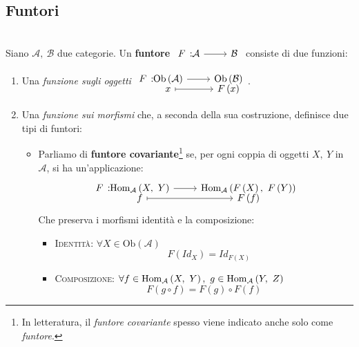 \subsection{Funtori}
\begin{define}[Funtore.]~{}\\
Siano $\mathcal{A},\ \mathcal{B}$ due categorie. Un \textbf{funtore} $\funz{F}{\mathcal{A}}{\mathcal{B}}$ consiste di due funzioni:
\begin{enumerate}
	\item Una \textit{funzione sugli oggetti} $\funztot{F}{\mathrm{Ob}\left(\mathcal{A}\right)}{\mathrm{Ob}\left(\mathcal{B}\right)}{x}{F\left(x\right)}$.
	\item Una \textit{funzione sui morfismi} che, a seconda della sua costruzione, definisce due tipi di funtori:
	\begin{itemize}
		\item Parliamo di \textbf{funtore covariante}\footnote{In letteratura, il \textit{funtore covariante} spesso viene indicato anche solo come \textit{funtore}.} se, per ogni coppia di oggetti $X,\ Y$ in $\mathcal{A}$, si ha un'applicazione:
		\begin{equation}
			\funztot{F}{\homo{\mathcal{A}}{X}{Y}}{\homo{\mathcal{A}}{F\left(X\right)}{F\left(Y\right)}}{f}{F\left(f\right)}
		\end{equation}
	Che preserva i morfismi identità e la composizione:
	\begin{itemize}
		\item \textsc{Identità}: $\forall X\in \mathrm{Ob}\left(\mathcal{A}\right)$
		\begin{equation}
			\quad F\left(Id_X\right)=Id_{F\left(X\right)}
		\end{equation}
		\item \textsc{Composizione}: $\forall f\in\homo{\mathcal{A}}{X}{Y},\ g\in\homo{\mathcal{A}}{Y}{Z}$
		\begin{equation}
			F\left(g\circ f\right)=F\left(g\right)\circ F\left(f\right)
		\end{equation}
	\end{itemize}
	\begin{center}
\end{center}
\end{itemize}
\end{enumerate}
\end{define}
